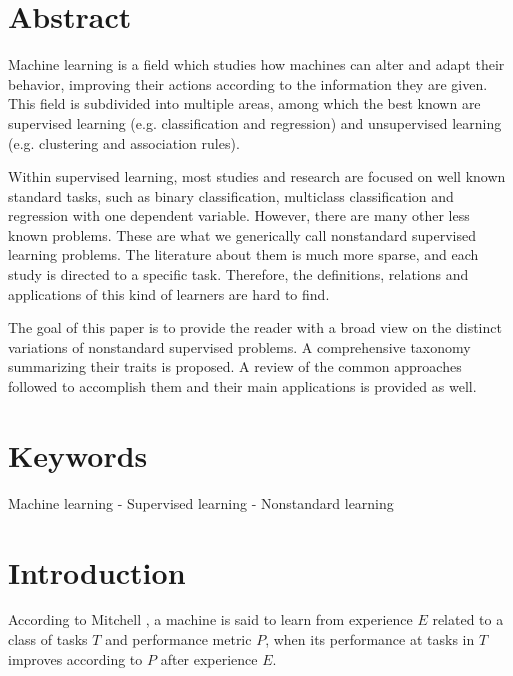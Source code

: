\documentclass[
	fontsize=11pt, %
	twoside=false, %
	open=any, %
	secnumdepth=1, %
]{kaobook}
\begin{document}

  \section*{Abstract}
Machine learning is a field which studies how machines can alter and adapt their behavior, improving their actions according to the information they are given. This field is subdivided into multiple areas, among which the best known are supervised learning (e.g. classification and regression) and unsupervised learning (e.g. clustering and association rules).

Within supervised learning, most studies and research are focused on well known standard tasks, such as binary classification, multiclass classification and regression with one dependent variable. However, there are many other less known problems. These are what we generically call nonstandard supervised learning problems. The literature about them is much more sparse, and each study is directed to a specific task. Therefore, the definitions, relations and applications of this kind of learners are hard to find.

The goal of this paper is to provide the reader with a broad view on the distinct variations of nonstandard supervised problems. A comprehensive taxonomy summarizing their traits is proposed. A review of the common approaches followed to accomplish them and their main applications is provided as well.

\section*{Keywords}
Machine learning - Supervised learning - Nonstandard learning

\section{Introduction}
\label{intro}

According to Mitchell \cite{learning-mitchell}, a machine is said to learn from experience $E$ related to a class of tasks $T$ and performance metric $P$, when its performance at tasks in $T$  improves according to $P$ after experience $E$.
\end{document}
